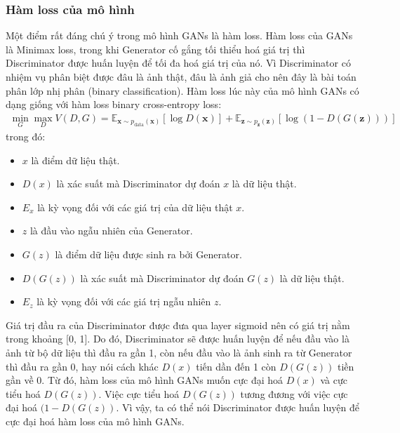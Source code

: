 {    \subsubsection{Hàm loss của mô hình}
    \noindent Một điểm rất đáng chú ý trong mô hình GANs là hàm loss. Hàm loss của GANs là Minimax loss, trong khi Generator cố gắng tối thiểu hoá giá trị thì Discriminator được huấn luyện để tối đa hoá giá trị của nó. Vì Discriminator có nhiệm vụ phân biệt được đâu là ảnh thật, đâu là ảnh giả cho nên đây là bài toán phân lớp nhị phân (binary classification). Hàm loss lúc này của mô hình GANs có dạng giống với hàm loss binary cross-entropy loss:
    \begin{align}
    \min_G \max_D V(D, G) = \mathbb{E}_{\bm{x} \sim p_{\text{data}}(\bm{x})}[\log D(\bm{x})] + \mathbb{E}_{\bm{z} \sim p_{\bm{z}}(\bm{z})}[\log (1 - D(G(\bm{z})))]
    \label{func:gan_loss}
    \end{align}
    trong đó:
    \begin{itemize}[leftmargin=0cm,itemindent=.5cm,labelwidth=\itemindent,labelsep=0cm,align=left]
        \item $x$ là điểm dữ liệu thật.
        \item $D(x)$ là xác suất mà Discriminator dự đoán $x$ là dữ liệu thật.
        \item $E_x$ là kỳ vọng đối với các giá trị của dữ liệu thật $x$.
        \item $z$ là đầu vào ngẫu nhiên của Generator.
        \item $G(z)$ là điểm dữ liệu được sinh ra bởi Generator.
        \item $D(G(z))$ là xác suất mà Discriminator dự đoán $G(z)$ là dữ liệu thật.
        \item $E_z$ là kỳ vọng đối với các giá trị ngẫu nhiên $z$.
    \end{itemize}
    Giá trị đầu ra của Discriminator được đưa qua layer sigmoid nên có giá trị nằm trong khoảng [0, 1]. Do đó, Discriminator sẽ được huấn luyện để nếu đầu vào là ảnh từ bộ dữ liệu thì đầu ra gần 1, còn nếu đầu vào là ảnh sinh ra từ Generator thì đầu ra gần 0, hay nói cách khác $D(x)$ tiến dần đến 1 còn $D(G(z))$ tiền gần về 0. Từ đó, hàm loss của mô hình GANs muốn cực đại hoá $D(x)$ và cực tiểu hoá $D(G(z))$. Việc cực tiểu hoá $D(G(z))$ tương đương với việc cực đại hoá $(1 - D(G(z))$. Vì vậy, ta có thể nói Discriminator được huấn luyện để cực đại hoá hàm loss của mô hình GANs.
}

